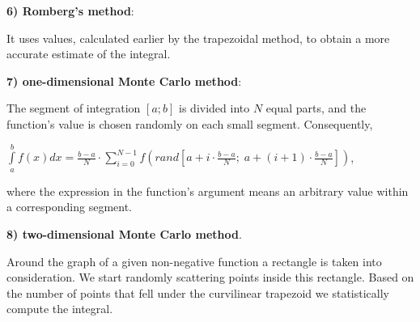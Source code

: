 \documentclass[12pt]{article}
\begin{document}
\begin{titlepage}
\begin{flushleft}
\textbf{6) Romberg's method}:

It uses values, calculated earlier by the trapezoidal method, to obtain a more accurate estimate of the integral.

\textbf{7) one-dimensional Monte Carlo method}:

The segment of integration $[a; b]$ is divided into $N$ equal parts, and the function's value is chosen randomly on each small segment. Consequently,

$\int\limits_{a}^{b} f(x)dx=\frac{b-a}{N}\cdot\displaystyle\sum_{i=0}^{N-1} f\left( rand\left[a+i\cdot\frac{b-a}{N};\;a+\left(i+1\right)\cdot\frac{b-a}{N}\right]\right)$,

where the expression in the function's argument means an arbitrary value within a corresponding segment.

\textbf{8) two-dimensional Monte Carlo method}.

Around the graph of a given non-negative function a rectangle is taken into consideration. We start randomly scattering points inside this rectangle. Based on the number of points that fell under the curvilinear trapezoid we statistically compute the integral.

\end{flushleft}
\end{titlepage}
\end{document}
